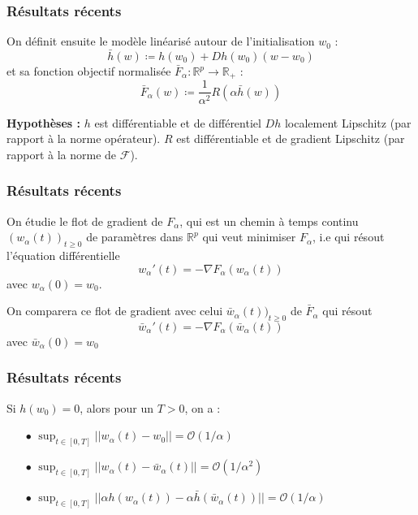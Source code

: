 \documentclass[aspectratio=169]{beamer}
\begin{document}
\begin{frame}
	\frametitle{Résultats récents}

On définit ensuite le modèle linéarisé autour de l'initialisation $w_0$ : \[\bar{h} (w) \coloneqq h(w_0) + Dh(w_0)(w - w_0)\] et sa fonction objectif normalisée $\bar{F}_{\alpha} : \mathbb{R}^p \to \mathbb{R}_+$ : \[\bar{F}_{\alpha} (w) \coloneqq \frac{1}{\alpha^2} R(\alpha \bar{h}(w))\]

\pause

{\bf Hypothèses : } $h$ est différentiable et de différentiel $Dh$ localement Lipschitz (par rapport à la norme opérateur). $R$ est différentiable et de gradient Lipschitz (par rapport à la norme de $\mathcal{F}$). \\

\end{frame}

\begin{frame}
	\frametitle{Résultats récents}

 On étudie le flot de gradient de $F_{\alpha}$, qui est un chemin à temps continu $(w_{\alpha}(t))_{t\geq 0}$ de paramètres dans $\mathbb{R}^p$ qui veut minimiser $F_{\alpha}$, i.e qui résout l'équation différentielle 
\[w_{\alpha}'(t) = - \nabla F_{\alpha}(w_{\alpha}(t))\] avec $w_{\alpha}(0) = w_0$.

\pause

 On comparera ce flot de gradient avec celui $\bar{w}_{\alpha}(t))_{t\geq 0}$ de $\bar{F}_{\alpha}$ qui résout
\[\bar{w}_{\alpha}'(t) = - \nabla F_{\alpha}(\bar{w}_{\alpha}(t))\] avec $\bar{w}_{\alpha}(0) = w_0$
\end{frame}

\begin{frame}
	\frametitle{Résultats récents}
\begin{theorem}
	Si $h(w_0) = 0$, alors pour un $T > 0$, on a :
	\begin{itemize}
		\item[$\bullet$] $\sup_{t \in [0, T]} ||w_{\alpha}(t) - w_0|| = \mathcal{O}(1 / \alpha)$
		\pause
		\item[$\bullet$] $\sup_{t \in [0, T]} ||w_{\alpha}(t) - \bar{w}_{\alpha}(t)|| = \mathcal{O}(1 / \alpha^2)$
		\pause
		\item[$\bullet$] $\sup_{t \in [0, T]} ||\alpha h(w_{\alpha}(t)) - \alpha \bar{h}(\bar{w}_{\alpha}(t))|| = \mathcal{O}(1 / \alpha)$
	\end{itemize}
\end{theorem}
\end{frame}
\end{document}
